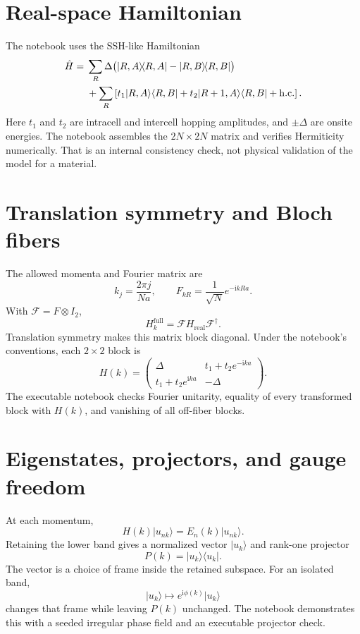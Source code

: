 \documentclass[11pt]{article}
\newcommand{\ii}{\mathrm i}
\newcommand{\hc}{\mathrm{h.c.}}
\newcommand{\ket}[1]{\lvert #1\rangle}
\newcommand{\bra}[1]{\langle #1\rvert}
\newcommand{\projector}[1]{\lvert #1\rangle\!\langle #1\rvert}
\begin{document}
\section{Real-space Hamiltonian}

The notebook uses the SSH-like Hamiltonian
\begin{align}
\hat H={}&\sum_R\Delta\bigl(\projector{R,A}-\projector{R,B}\bigr)\notag\\
&+\sum_R\left[
 t_1\ket{R,A}\bra{R,B}
 +t_2\ket{R+1,A}\bra{R,B}+\hc\right].
\end{align}
Here $t_1$ and $t_2$ are intracell and intercell hopping amplitudes, and
$\pm\Delta$ are onsite energies. The notebook assembles the $2N\times2N$ matrix
and verifies Hermiticity numerically. That is an internal consistency check, not
physical validation of the model for a material.

\section{Translation symmetry and Bloch fibers}

The allowed momenta and Fourier matrix are
\begin{equation}
 k_j=\frac{2\pi j}{Na},
 \qquad
 F_{kR}=\frac{1}{\sqrt N}e^{-\ii kRa}.
\end{equation}
With $\mathcal F=F\otimes I_2$,
\begin{equation}
 H_k^{\mathrm{full}}=\mathcal F H_{\mathrm{real}}\mathcal F^\dagger.
\end{equation}
Translation symmetry makes this matrix block diagonal. Under the notebook's
conventions, each $2\times2$ block is
\begin{equation}
 H(k)=
 \begin{pmatrix}
  \Delta & t_1+t_2e^{-\ii ka}\\
  t_1+t_2e^{\ii ka} & -\Delta
 \end{pmatrix}.
\end{equation}
The executable notebook checks Fourier unitarity, equality of every transformed
block with $H(k)$, and vanishing of all off-fiber blocks.

\section{Eigenstates, projectors, and gauge freedom}

At each momentum,
\begin{equation}
 H(k)\ket{u_{nk}}=E_n(k)\ket{u_{nk}}.
\end{equation}
Retaining the lower band gives a normalized vector $\ket{u_k}$ and rank-one
projector
\begin{equation}
 P(k)=\projector{u_k}.
\end{equation}
The vector is a choice of frame inside the retained subspace. For an isolated
band,
\begin{equation}
 \ket{u_k}\longmapsto e^{\ii\phi(k)}\ket{u_k}
\end{equation}
changes that frame while leaving $P(k)$ unchanged. The notebook demonstrates
this with a seeded irregular phase field and an executable projector check.
\end{document}
